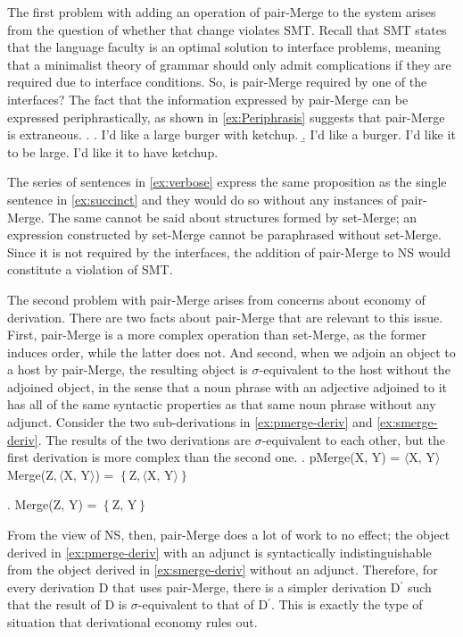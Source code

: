 \documentclass[MilwayThesis]{subfiles}
\begin{document}
The first problem with adding an operation of pair-Merge to the system arises from the question of whether that change violates SMT.
Recall that SMT states that the language faculty is an optimal solution to interface problems, meaning that a minimalist theory of grammar should only admit complications if they are required due to interface conditions.
So, is pair-Merge required by one of the interfaces?
The fact that the information expressed by pair-Merge can be expressed periphrastically, as shown in \cref{ex:Periphrasis} suggests that pair-Merge is extraneous.
\ex.\label{ex:Periphrasis}
\a. I'd like a large burger with ketchup.\label{ex:succinct}
\b. I'd like a burger. I'd like it to be large. I'd like it to have ketchup.\label{ex:verbose}

The series of sentences in \cref{ex:verbose} express the same proposition as the single sentence in \cref{ex:succinct} and they would do so without any instances of pair-Merge.
The same cannot be said about structures formed by set-Merge; an expression constructed by set-Merge cannot be paraphrased without set-Merge.
Since it is not required by the interfaces, the addition of pair-Merge to NS would constitute a violation of SMT.

The second problem with pair-Merge arises from concerns about economy of derivation.
There are two facts about pair-Merge that are relevant to this issue.
First, pair-Merge is a more complex operation than set-Merge, as the former induces order, while the latter does not.
And second, when we adjoin an object to a host by pair-Merge, the resulting object is $\sigma$-equivalent to the host without the adjoined object, in the sense that a noun phrase with an adjective adjoined to it has all of the same syntactic properties as that same noun phrase without any adjunct.
Consider the two sub-derivations in \cref{ex:pmerge-deriv} and \cref{ex:smerge-deriv}.
The results of the two derivations are $\sigma$-equivalent to each other, but the first derivation is more complex than the second one.
\ex.\label{ex:pmerge-deriv} pMerge(X, Y) = $\langle\text{X, Y}\rangle$\\
Merge(Z$, \langle\text{X, Y}\rangle$) = $\left\{ \text{Z}, \langle\text{X, Y}\rangle \right\}$

\ex.\label{ex:smerge-deriv} Merge(Z, Y) = $\left\{ \text{Z, Y} \right\}$

From the view of NS, then, pair-Merge does a lot of work to no effect; the object derived in \cref{ex:pmerge-deriv} with an adjunct is syntactically indistinguishable from the object derived in \cref{ex:smerge-deriv} without an adjunct.
Therefore, for every derivation D that uses pair-Merge, there is a simpler derivation D$^\prime$ such that the result of D is $\sigma$-equivalent to that of D$^\prime$.
This is exactly the type of situation that derivational economy rules out.
\end{document}
